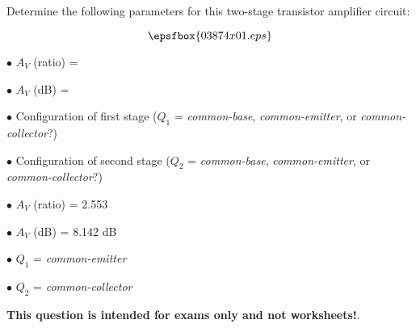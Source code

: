

Determine the following parameters for this two-stage transistor amplifier circuit:

$$\epsfbox{03874x01.eps}$$

\medskip
\item{$\bullet$} $A_V$ (ratio) = 
\item{$\bullet$} $A_V$ (dB) = 
\item{$\bullet$} Configuration of first stage ($Q_1$ = {\it common-base}, {\it common-emitter}, or {\it common-collector}?)
\item{$\bullet$} Configuration of second stage ($Q_2$ = {\it common-base}, {\it common-emitter}, or {\it common-collector}?)
\medskip







\medskip
\item{$\bullet$} $A_V$ (ratio) = 2.553
\item{$\bullet$} $A_V$ (dB) = 8.142 dB
\item{$\bullet$} $Q_1$ = {\it common-emitter}
\item{$\bullet$} $Q_2$ = {\it common-collector}
\medskip







{\bf This question is intended for exams only and not worksheets!}.




